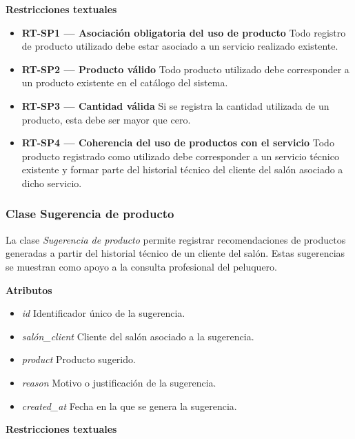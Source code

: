\textbf{Restricciones textuales}

\begin{itemize}

      \item \textbf{RT-SP1 — Asociación obligatoria del uso de producto}
            Todo registro de producto utilizado debe estar asociado a un servicio realizado existente.
      \item \textbf{RT-SP2 — Producto válido}
            Todo producto utilizado debe corresponder a un producto existente en el catálogo del sistema.
      \item \textbf{RT-SP3 — Cantidad válida}
            Si se registra la cantidad utilizada de un producto, esta debe ser mayor que cero.
      \item \textbf{RT-SP4 — Coherencia del uso de productos con el servicio}
            Todo producto registrado como utilizado debe corresponder a un servicio técnico existente y formar parte del historial técnico del cliente del salón asociado a dicho servicio.
\end{itemize}

\subsubsection{Clase Sugerencia de producto}

La clase \textit{Sugerencia de producto} permite registrar recomendaciones de productos generadas a partir del historial técnico de un cliente del salón. Estas sugerencias se muestran como apoyo a la consulta profesional del peluquero.

\textbf{Atributos}

\begin{itemize}

      \item \textit{id}
            Identificador único de la sugerencia.
      \item \textit{salón\_client}
            Cliente del salón asociado a la sugerencia.
      \item \textit{product}
            Producto sugerido.
      \item \textit{reason}
            Motivo o justificación de la sugerencia.
      \item \textit{created\_at}
            Fecha en la que se genera la sugerencia.

\end{itemize}

\textbf{Restricciones textuales}

